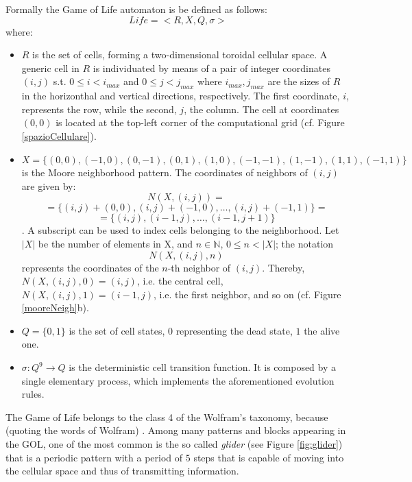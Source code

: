 Formally the Game of Life automaton is be defined as follows:
$$Life = < R, X, Q, \sigma >$$ where:
\begin{itemize}
	\item $R$ is the set of cells, forming a two-dimensional toroidal cellular space. A generic
	cell in $R$ is individuated by means of a pair of integer
	coordinates $(i, j)$ s.t. $0 \leq i < i_{max}$ and $0 \leq j <
	j_{max}$ where $i_{max},j_{max}$ are the sizes of $R$ in the horizonthal and vertical directions, respectively.
	The first coordinate, $i$, represents the row, while
	the second, $j$, the column. The cell at coordinates $(0,0)$ is
	located at the top-left corner of the computational grid
	(cf. Figure \ref{spazioCellulare}).
	
	\item $X = \{(0,0), (-1, 0), (0, -1), (0, 1), (1, 0), (-1,-1),
	(1,-1), (1,1), (-1,1)\}$ is the Moore neighborhood pattern. The
	coordinates of neighbors of $(i,j)$ are given by:
	$$N(X, (i, j)) = $$
	$$= \{(i, j)+(0,0), (i, j)+(-1, 0), \dots, (i, j)+(-1,1)\} =$$
	$$= \{(i, j), (i-1, j), \dots, (i-1,j+1)\}$$ .
	A subscript	can be used to index cells belonging to the
	neighborhood. Let $|X|$ be the number of elements in X, and $n
	\in \mathbb{N}$, $0 \leq n < |X|$; the notation
	$$N(X, (i, j), n)$$
	represents the coordinates of the $n$-th neighbor of  $(i,j)$.
	Thereby, $N(X, (i, j), 0) = (i, j)$, i.e. the
	central cell, $N(X, (i, j), 1) = (i-1, j)$, i.e. the first
	neighbor, and so on (cf. Figure \ref{mooreNeigh}b).
	
	\item $Q = \{0, 1\}$ is the set of cell states, $0$ representing the
	dead state, $1$ the alive one.
	
	\item $\sigma : Q^9 \rightarrow Q$ is the deterministic cell
	transition function. It is composed by a single elementary process,
	which implements the aforementioned evolution rules.
\end{itemize}
The Game of Life belongs to the class 4 of the Wolfram's taxonomy, because (quoting the words of Wolfram)
. 
Among many patterns and blocks appearing in the GOL, one of the most common is the so called \emph{glider} (see Figure \ref{fig:glider}) that is a periodic pattern with a period of $5$ steps that is capable of moving into the cellular space and thus of transmitting information.
